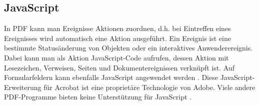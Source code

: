 \subsection{JavaScript}
In PDF kann man Ereignisse Aktionen zuordnen, d.h. bei Eintreffen eines Ereignisses wird automatisch eine Aktion ausgeführt. Ein Ereignis ist eine bestimmte Statusänderung von Objekten oder ein interaktives Anwenderereignis. Dabei kann man als Aktion JavaScript-Code aufrufen, dessen Aktion mit Lesezeichen, Verweisen, Seiten und Dokumentereignissen verknüpft ist. Auf Formularfeldern kann ebenfalls JavaScript angewendet werden \cite{softx}. Diese JavaScript-Erweiterung für Acrobat ist eine proprietäre Technologie von Adobe. Viele andere PDF-Programme bieten keine Unterstützung für JavaScript \cite{wiki-pdf-engl}. 